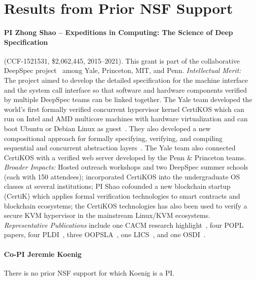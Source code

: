\section{Results from Prior NSF Support}
\label{sec:prior}

\paragraph{PI Zhong Shao -- Expeditions in Computing: The Science of Deep Specification} (CCF-1521531, \$2,062,445, 2015--2021). 
This grant is part of the collaborative DeepSpec project~\cite{deepspec} among Yale, Princeton, MIT, and Penn. 
\emph{Intellectual Merit:} 
The project aimed to develop the detailed specification for the
machine interface and the system call interface so that software and
hardware components verified by multiple DeepSpec teams can be linked
together. The Yale team developed the world's first formally verified
concurrent hypervisor kernel CertiKOS which can run on Intel and AMD
multicore machines with hardware virtualization and can boot Ubuntu or
Debian Linux as guest~\cite{certikos-osdi16}. They also developed a
new compositional approach for formally specifying, verifying, and
compiling sequential and concurrent abstraction
layers~\cite{chen16,costanzo16,certikos-osdi16,ccal18,compcerto,wang2019,koenig20}.
The Yale team also connected CertiKOS with a verified web server
developed by the Penn \& Princeton teams.
\emph{Broader Impacts:} 
Hosted outreach workshops and two DeepSpec summer schools (each with
150 attendees); incorporated CertiKOS into the undergraduate OS
classes at several institutions; PI Shao cofounded a new blockchain startup
(CertiK) which applies formal verification technologies to smart
contracts and blockchain ecosystems; the CertiKOS technologies has
also been used to verify a secure KVM hypervisor in the mainstream
Linux/KVM ecosystems.  {\em Representative Publications} include one
CACM research highlight~\cite{certikos-cacm19}, four
POPL~\cite{wang2019,liu-popl20,wang2022,layered22} papers, four
PLDI~\cite{chen16,costanzo16,ccal18,compcerto}, three
OOPSLA~\cite{deepsea19,compcertelf20,ado21}, one LICS~\cite{koenig20},
and one OSDI~\cite{certikos-osdi16}.

\paragraph{Co-PI Jeremie Koenig}
There is no prior NSF support for which Koenig is a PI.

